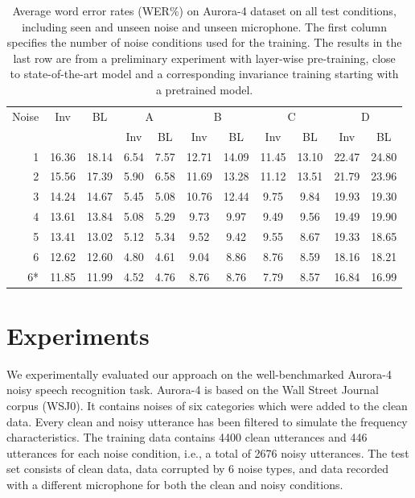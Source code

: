 \documentclass[a4paper]{article}
\begin{document}

\begin{table}[t]
    \centering
    \caption{Average word error rates (WER\%) on Aurora-4 dataset on all test conditions,
        including seen and unseen noise and unseen microphone. The first column
        specifies the number of noise conditions used for the training. The
        results in the last row are from a preliminary experiment with
        layer-wise pre-training, close to state-of-the-art
        model and a corresponding invariance training starting with a pretrained model.}
    \label{tab:results}
    \begin{tabular}{r|cc||cc|cc|cc|cc}
        Noise       &Inv&BL&  \multicolumn{2}{c|}{A} & \multicolumn{2}{c|}{B} & \multicolumn{2}{c|}{C} & \multicolumn{2}{c}{D}\\
               & & &  Inv & BL & Inv & BL & Inv & BL & Inv & BL\\
    \hline
    1           &16.36        &18.14 &6.54&7.57    &12.71& 14.09   & 11.45&   13.10    & 22.47 &   24.80    \\
    2           &15.56        &17.39 &5.90&  6.58 &   11.69   &13.28   &11.12   &13.51   &21.79   &23.96 \\
    3           &14.24        &14.67 &5.45 & 5.08&    10.76&   12.44&   9.75&    9.84 &   19.93&   19.30\\
    4           &13.61        &13.84 & 5.08 &5.29    &9.73    &9.97    &9.49    &9.56    &19.49   &19.90\\         
    5           &13.41        &13.02 & 5.12 &5.34    &9.52    &9.42    &9.55    &8.67    &19.33   &18.65\\         
    6           &12.62        &12.60 & 4.80 &4.61    &9.04    &8.86    &8.76    &8.59    &18.16   &18.21\\
    \hline\hline
    6* &11.85        &11.99    &4.52    &4.76    &8.76    &8.76    &7.79    &8.57    &16.84&    16.99
    \end{tabular}
\end{table}

\section{Experiments}
\label{sec:experiments}
We experimentally evaluated our approach   
on the well-benchmarked Aurora-4 \citep{parihar2002aurora} noisy speech recognition task. Aurora-4
is based on the Wall Street Journal corpus (WSJ0). It contains noises of 
six categories which were added to the clean data. Every clean and noisy
utterance has been 
filtered to simulate the frequency characteristics. The training
data contains 4400 clean utterances and 446 utterances for each noise condition,
i.e., a total of 2676 noisy utterances.
The test set consists of clean data, data corrupted by 6 noise types, and data 
recorded with a different microphone for both the clean and noisy conditions.
\end{document}
